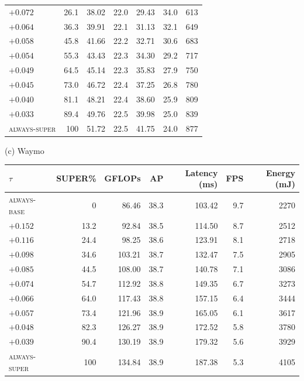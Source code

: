 \begin{table}[!t]
\begin{minipage}[t]{0.49\textwidth}
\begin{tabular}{lrrrrrr}
$+0.072$ & 26.1 & 38.02 & 22.0 & 29.43 & 34.0 & 613\\
$+0.064$ & 36.3 & 39.91 & 22.1 & 31.13 & 32.1 & 649\\
$+0.058$ & 45.8 & 41.66 & 22.2 & 32.71 & 30.6 & 683\\
$+0.054$ & 55.3 & 43.43 & 22.3 & 34.30 & 29.2 & 717\\
$+0.049$ & 64.5 & 45.14 & 22.3 & 35.83 & 27.9 & 750\\
$+0.045$ & 73.0 & 46.72 & 22.4 & 37.25 & 26.8 & 780\\
$+0.040$ & 81.1 & 48.21 & 22.4 & 38.60 & 25.9 & 809\\
$+0.033$ & 89.4 & 49.76 & 22.5 & 39.98 & 25.0 & 839\\
\textsc{always-super} & 100 & 51.72 & 22.5 & 41.75 & 24.0 & 877\\
\bottomrule
\end{tabular}
\end{minipage}

\vspace{8pt}

\begin{minipage}[t]{0.49\textwidth}
\centering
{\small (c) Waymo}\\[2pt]
\footnotesize
\begin{tabular}{lrrrrrr}
\toprule
$\tau$ & SUPER\% & GFLOPs & AP & Latency (ms) & FPS & Energy (mJ)\\
\midrule
\textsc{always-base} & 0 & 86.46 & 38.3 & 103.42 & 9.7 & 2270\\
$+0.152$ & 13.2 & 92.84 & 38.5 & 114.50 & 8.7 & 2512\\
$+0.116$ & 24.4 & 98.25 & 38.6 & 123.91 & 8.1 & 2718\\
$+0.098$ & 34.6 & 103.21 & 38.7 & 132.47 & 7.5 & 2905\\
$+0.085$ & 44.5 & 108.00 & 38.7 & 140.78 & 7.1 & 3086\\
$+0.074$ & 54.7 & 112.92 & 38.8 & 149.35 & 6.7 & 3273\\
$+0.066$ & 64.0 & 117.43 & 38.8 & 157.15 & 6.4 & 3444\\
$+0.057$ & 73.4 & 121.96 & 38.9 & 165.05 & 6.1 & 3617\\
$+0.048$ & 82.3 & 126.27 & 38.9 & 172.52 & 5.8 & 3780\\
$+0.039$ & 90.4 & 130.19 & 38.9 & 179.32 & 5.6 & 3929\\
\textsc{always-super} & 100 & 134.84 & 38.9 & 187.38 & 5.3 & 4105\\
\bottomrule
\end{tabular}
\end{minipage}
\end{table}


